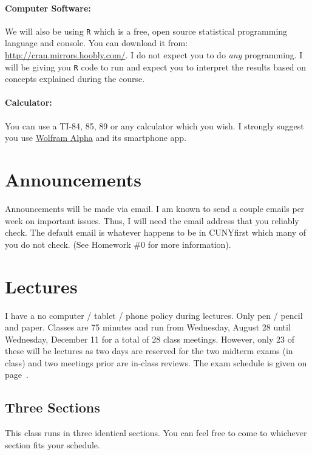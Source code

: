 \documentclass[12pt]{article}
\begin{document}
\paragraph{Computer Software:} We will also be using \texttt{R} which is a free, open source statistical programming language and console. You can download it from: \url{http://cran.mirrors.hoobly.com/}. I do not expect you to do \textit{any} programming. I will be giving you \texttt{R} code to run and expect you to interpret the results based on concepts explained during the course.

\paragraph{Calculator:} You can use a TI-84, 85, 89 or any calculator which you wish. I strongly suggest you use \href{http://www.wolframalpha.com/}{Wolfram Alpha} and its smartphone app.

\section*{Announcements}

Announcements will be made via email. I am known to send a couple emails per week on important issues. Thus, I will need the email address that you reliably check. The default email is whatever happens to be in CUNYfirst which many of you do not check. (See Homework \#0 for more information).

\section*{Lectures}

I have a no computer / tablet / phone policy during lectures. Only pen / pencil and paper. Classes are 75 minutes and run from Wednesday, August 28 until Wednesday, December 11 for a total of 28 class meetings. However, only 23 of these will be lectures as two days are reserved for the two midterm exams (in class) and two meetings prior are in-class reviews. The exam schedule is given on page~\pageref{subsec:exam_schedule}.

\subsection*{Three Sections}

This class runs in three identical sections. You can feel free to come to whichever section fits your schedule.
\end{document}
